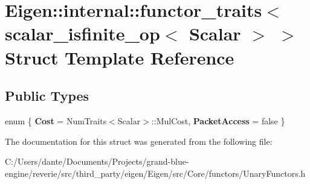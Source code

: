 \hypertarget{struct_eigen_1_1internal_1_1functor__traits_3_01scalar__isfinite__op_3_01_scalar_01_4_01_4}{}\section{Eigen\+::internal\+::functor\+\_\+traits$<$ scalar\+\_\+isfinite\+\_\+op$<$ Scalar $>$ $>$ Struct Template Reference}
\label{struct_eigen_1_1internal_1_1functor__traits_3_01scalar__isfinite__op_3_01_scalar_01_4_01_4}
\subsection*{Public Types}
\begin{DoxyCompactItemize}
\item 
\mbox{\label{struct_eigen_1_1internal_1_1functor__traits_3_01scalar__isfinite__op_3_01_scalar_01_4_01_4_a644dbc7594882c29fd90fe48fc9fe8e4}} 
enum \{ {\bfseries Cost} = Num\+Traits$<$Scalar$>$\+::Mul\+Cost, 
{\bfseries Packet\+Access} = false
 \}
\end{DoxyCompactItemize}


The documentation for this struct was generated from the following file\+:\begin{DoxyCompactItemize}
\item 
C\+:/\+Users/dante/\+Documents/\+Projects/grand-\/blue-\/engine/reverie/src/third\+\_\+party/eigen/\+Eigen/src/\+Core/functors/Unary\+Functors.\+h\end{DoxyCompactItemize}
